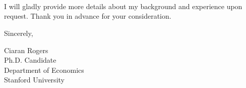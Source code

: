 \documentclass{letter}
\begin{document}
{{{\begin{letter}{\Name \\ \Address \\ \City \State~\Zip}
{\CoverBonusGeneral 
}{}

I will gladly provide more details about my background and experience upon request. Thank you in advance for your consideration.

\vspace{.5cm} 
Sincerely,

\vspace{.25cm} 
Ciaran Rogers \\
Ph.D. Candidate\\
Department of Economics \\
Stanford University

\end{letter}}{}

}
}
\end{document}
